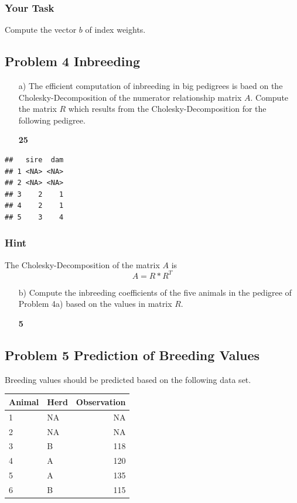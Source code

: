 \documentclass[]{article}
\newcommand{\points}[1]
{\begin{flushright}\textbf{#1}\end{flushright}}
\begin{document}
\subsubsection{Your Task}\label{your-task-2}

Compute the vector \(b\) of index weights.

\clearpage
\pagebreak

\subsection{Problem 4 Inbreeding}\label{problem-4-inbreeding}

\begin{enumerate}
\item[a)] The efficient computation of inbreeding in big pedigrees is baed on the Cholesky-Decomposition of the numerator relationship matrix $A$. Compute the matrix $R$ which results from the Cholesky-Decomposition for the following pedigree.
\points{25}
\end{enumerate}

\begin{verbatim}
##   sire  dam
## 1 <NA> <NA>
## 2 <NA> <NA>
## 3    2    1
## 4    2    1
## 5    3    4
\end{verbatim}

\subsubsection{Hint}\label{hint}

The Cholesky-Decomposition of the matrix \(A\) is \[A = R*R^T\]

\clearpage
\pagebreak

\begin{enumerate}
\item[b)] Compute the inbreeding coefficients of the five animals in the pedigree of Problem  4a) based on the values in matrix $R$. 
\points{5}
\end{enumerate}

\clearpage
\pagebreak

\subsection{Problem 5 Prediction of Breeding
Values}\label{problem-5-prediction-of-breeding-values}

Breeding values should be predicted based on the following data set.

\begin{longtable}[]{@{}llr@{}}
\toprule
Animal & Herd & Observation\tabularnewline
\midrule
\endhead
1 & NA & NA\tabularnewline
2 & NA & NA\tabularnewline
3 & B & 118\tabularnewline
4 & A & 120\tabularnewline
5 & A & 135\tabularnewline
6 & B & 115\tabularnewline
\bottomrule
\end{longtable}
\end{document}
